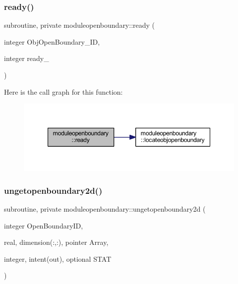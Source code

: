 \subsubsection{\texorpdfstring{ready()}{ready()}}
{\footnotesize\ttfamily subroutine, private moduleopenboundary\+::ready (\begin{DoxyParamCaption}\item[{integer}]{Obj\+Open\+Boundary\+\_\+\+ID,  }\item[{integer}]{ready\+\_\+ }\end{DoxyParamCaption})\hspace{0.3cm}{\ttfamily [private]}}

Here is the call graph for this function\+:\nopagebreak
\begin{figure}[H]
\begin{center}
\leavevmode
\includegraphics[width=347pt]{namespacemoduleopenboundary_af8f8c38fee04ad167eec9a779f717d85_cgraph}
\end{center}
\end{figure}
\mbox{\label{namespacemoduleopenboundary_a601c9cebbb40986b76e9488a0af4dc3a}} 
\subsubsection{\texorpdfstring{ungetopenboundary2d()}{ungetopenboundary2d()}}
{\footnotesize\ttfamily subroutine, private moduleopenboundary\+::ungetopenboundary2d (\begin{DoxyParamCaption}\item[{integer}]{Open\+Boundary\+ID,  }\item[{real, dimension(\+:,\+:), pointer}]{Array,  }\item[{integer, intent(out), optional}]{S\+T\+AT }\end{DoxyParamCaption})\hspace{0.3cm}{\ttfamily [private]}}

